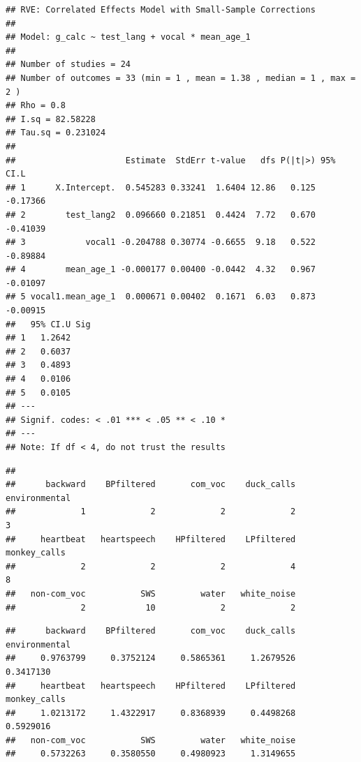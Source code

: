 \documentclass[man]{apa6}
\begin{document}
\begin{verbatim}
## RVE: Correlated Effects Model with Small-Sample Corrections 
## 
## Model: g_calc ~ test_lang + vocal * mean_age_1 
## 
## Number of studies = 24 
## Number of outcomes = 33 (min = 1 , mean = 1.38 , median = 1 , max = 2 )
## Rho = 0.8 
## I.sq = 82.58228 
## Tau.sq = 0.231024 
## 
##                      Estimate  StdErr t-value   dfs P(|t|>) 95% CI.L
## 1      X.Intercept.  0.545283 0.33241  1.6404 12.86   0.125 -0.17366
## 2        test_lang2  0.096660 0.21851  0.4424  7.72   0.670 -0.41039
## 3            vocal1 -0.204788 0.30774 -0.6655  9.18   0.522 -0.89884
## 4        mean_age_1 -0.000177 0.00400 -0.0442  4.32   0.967 -0.01097
## 5 vocal1.mean_age_1  0.000671 0.00402  0.1671  6.03   0.873 -0.00915
##   95% CI.U Sig
## 1   1.2642    
## 2   0.6037    
## 3   0.4893    
## 4   0.0106    
## 5   0.0105    
## ---
## Signif. codes: < .01 *** < .05 ** < .10 *
## ---
## Note: If df < 4, do not trust the results
\end{verbatim}

\begin{verbatim}
## 
##      backward    BPfiltered       com_voc    duck_calls environmental 
##             1             2             2             2             3 
##     heartbeat   heartspeech    HPfiltered    LPfiltered  monkey_calls 
##             2             2             2             4             8 
##   non-com_voc           SWS         water   white_noise 
##             2            10             2             2
\end{verbatim}

\begin{verbatim}
##      backward    BPfiltered       com_voc    duck_calls environmental 
##     0.9763799     0.3752124     0.5865361     1.2679526     0.3417130 
##     heartbeat   heartspeech    HPfiltered    LPfiltered  monkey_calls 
##     1.0213172     1.4322917     0.8368939     0.4498268     0.5929016 
##   non-com_voc           SWS         water   white_noise 
##     0.5732263     0.3580550     0.4980923     1.3149655
\end{verbatim}
\end{document}
